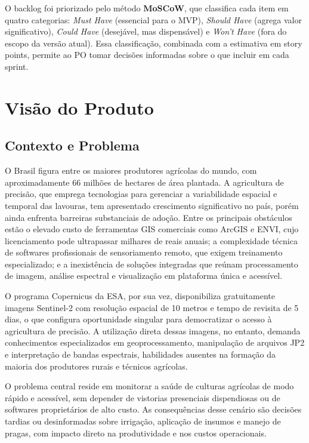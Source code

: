 \documentclass[12pt, a4paper]{article}
\begin{document}
O backlog foi priorizado pelo método \textbf{MoSCoW}, que classifica cada item em quatro categorias: \textit{Must Have} (essencial para o MVP), \textit{Should Have} (agrega valor significativo), \textit{Could Have} (desejável, mas dispensável) e \textit{Won't Have} (fora do escopo da versão atual). Essa classificação, combinada com a estimativa em story points, permite ao PO tomar decisões informadas sobre o que incluir em cada sprint.

\section{Visão do Produto}

\subsection{Contexto e Problema}

O Brasil figura entre os maiores produtores agrícolas do mundo, com aproximadamente 66 milhões de hectares de área plantada. A agricultura de precisão, que emprega tecnologias para gerenciar a variabilidade espacial e temporal das lavouras, tem apresentado crescimento significativo no país, porém ainda enfrenta barreiras substanciais de adoção. Entre os principais obstáculos estão o elevado custo de ferramentas GIS comerciais como ArcGIS e ENVI, cujo licenciamento pode ultrapassar milhares de reais anuais; a complexidade técnica de softwares profissionais de sensoriamento remoto, que exigem treinamento especializado; e a inexistência de soluções integradas que reúnam processamento de imagem, análise espectral e visualização em plataforma única e acessível.

O programa Copernicus da ESA, por sua vez, disponibiliza gratuitamente imagens Sentinel-2 com resolução espacial de 10 metros e tempo de revisita de 5 dias, o que configura oportunidade singular para democratizar o acesso à agricultura de precisão. A utilização direta dessas imagens, no entanto, demanda conhecimentos especializados em geoprocessamento, manipulação de arquivos JP2 e interpretação de bandas espectrais, habilidades ausentes na formação da maioria dos produtores rurais e técnicos agrícolas.

O problema central reside em monitorar a saúde de culturas agrícolas de modo rápido e acessível, sem depender de vistorias presenciais dispendiosas ou de softwares proprietários de alto custo. As consequências desse cenário são decisões tardias ou desinformadas sobre irrigação, aplicação de insumos e manejo de pragas, com impacto direto na produtividade e nos custos operacionais.
\end{document}
